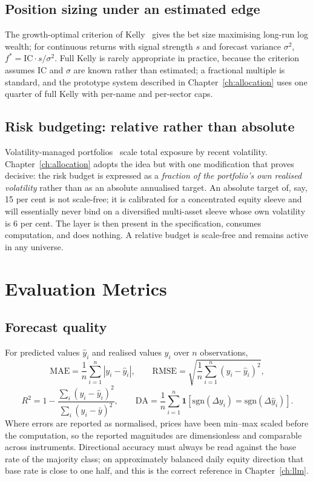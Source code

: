 \subsection{Position sizing under an estimated edge}

The growth-optimal criterion of Kelly~\cite{kelly1956} gives the bet size maximising long-run
log wealth; for continuous returns with signal strength $s$ and forecast variance
$\sigma^2$, $f^{*} = \mathrm{IC}\cdot s / \sigma^2$. Full Kelly is rarely appropriate in
practice, because the criterion assumes $\mathrm{IC}$ and $\sigma$ are known rather than
estimated; a fractional multiple is standard, and the prototype system described in
Chapter~\ref{ch:allocation} uses one quarter of full Kelly with per-name and per-sector caps.

\subsection{Risk budgeting: relative rather than absolute}

Volatility-managed portfolios~\cite{moreira2017} scale total exposure by recent volatility.
Chapter~\ref{ch:allocation} adopts the idea but with one modification that proves decisive: the
risk budget is expressed as a \emph{fraction of the portfolio's own realised volatility} rather
than as an absolute annualised target. An absolute target of, say, 15 per cent is not scale-free;
it is calibrated for a concentrated equity sleeve and will essentially never bind on a
diversified multi-asset sleeve whose own volatility is 6 per cent. The layer is then present in
the specification, consumes computation, and does nothing. A relative budget is scale-free and
remains active in any universe.

\section{Evaluation Metrics}

\subsection{Forecast quality}

For predicted values $\hat{y}_i$ and realised values $y_i$ over $n$ observations,
\begin{equation}
\mathrm{MAE} = \frac{1}{n}\sum_{i=1}^{n}\left|y_i - \hat{y}_i\right|,
\qquad
\mathrm{RMSE} = \sqrt{\frac{1}{n}\sum_{i=1}^{n}\left(y_i - \hat{y}_i\right)^2},
\end{equation}
\begin{equation}
R^2 = 1 - \frac{\sum_{i}(y_i - \hat{y}_i)^2}{\sum_{i}(y_i - \bar{y})^2},
\qquad
\mathrm{DA} = \frac{1}{n}\sum_{i=1}^{n}
\mathbf{1}\!\left[\mathrm{sgn}(\Delta y_i) = \mathrm{sgn}(\Delta \hat{y}_i)\right].
\end{equation}
Where errors are reported as normalised, prices have been min--max scaled before the
computation, so the reported magnitudes are dimensionless and comparable across instruments.
Directional accuracy must always be read against the base rate of the majority class; on
approximately balanced daily equity direction that base rate is close to one half, and this is
the correct reference in Chapter~\ref{ch:llm}.


